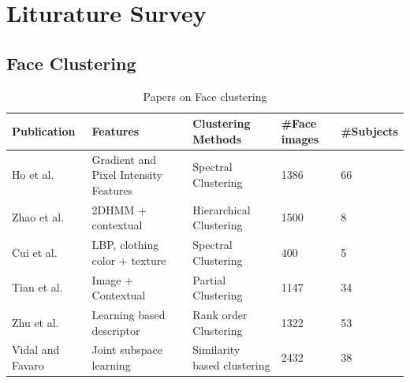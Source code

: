\documentclass[a4paper,12pt, twoside]{NITKReport}
\begin{document}
\newpage
\chapter{Liturature Survey}
\label{chap2}

\section{Face Clustering}
\begin{table}
  \centering
\begin{tabular}{ |p{3cm}|p{3cm}|p{2.5cm}|p{2cm}|p{2cm}|}
 \hline
 Publication & Features & Clustering Methods & \#Face images & \#Subjects\\
 \hline
 Ho et al.\cite{ho2003clustering} & Gradient and Pixel Intensity Features& Spectral Clustering & 1386 & 66\\
 \hline
 Zhao et al.\cite{zhao2006automatic} & 2DHMM $+$ contextual & Hierarchical Clustering & 1500 & 8\\
  \hline
 Cui et al.\cite{cui2007easyalbum} & LBP, clothing color $+$ texture & Spectral Clustering & 400 & 5\\
  \hline
 Tian et al.\cite{tian2007face} & Image $+$ Contextual & Partial Clustering & 1147 & 34\\
  \hline
 Zhu et al.\cite{zhu2011rank} & Learning based descriptor & Rank order Clustering & 1322 & 53\\
  \hline
  Vidal and Favaro \cite{li2015structured} \cite{zhang2014jointly} & Joint subspace learning & Similarity based clustering & 2432 & 38\\
 \hline
\end{tabular}
\caption{Papers on Face clustering}\label{table:papers}
\end{table}
\end{document}
